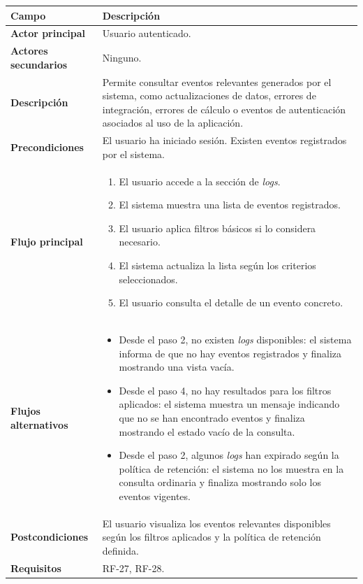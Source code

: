 {\renewcommand{\arraystretch}{1.25}\footnotesize
\begin{longtable}{p{3.2cm}p{10.2cm}}
\toprule
\textbf{Campo} & \textbf{Descripción} \\
\midrule
\textbf{Actor principal} & Usuario autenticado. \\
\textbf{Actores secundarios} & Ninguno. \\
\textbf{Descripción} & Permite consultar eventos relevantes generados por el sistema, como actualizaciones de datos, errores de integración, errores de cálculo o eventos de autenticación asociados al uso de la aplicación. \\
\textbf{Precondiciones} & El usuario ha iniciado sesión. Existen eventos registrados por el sistema. \\
\textbf{Flujo principal} & \begin{minipage}[t]{10.2cm}\begin{enumerate}[noitemsep,leftmargin=*]
    \item El usuario accede a la sección de \textit{logs}.
    \item El sistema muestra una lista de eventos registrados.
    \item El usuario aplica filtros básicos si lo considera necesario.
    \item El sistema actualiza la lista según los criterios seleccionados.
    \item El usuario consulta el detalle de un evento concreto.
\end{enumerate}\end{minipage} \\
\textbf{Flujos alternativos} & \begin{minipage}[t]{10.2cm}\begin{itemize}[noitemsep,leftmargin=*]
    \item Desde el paso 2, no existen \textit{logs} disponibles: el sistema informa de que no hay eventos registrados y finaliza mostrando una vista vacía.
    \item Desde el paso 4, no hay resultados para los filtros aplicados: el sistema muestra un mensaje indicando que no se han encontrado eventos y finaliza mostrando el estado vacío de la consulta.
    \item Desde el paso 2, algunos \textit{logs} han expirado según la política de retención: el sistema no los muestra en la consulta ordinaria y finaliza mostrando solo los eventos vigentes.
\end{itemize}\end{minipage} \\
\textbf{Postcondiciones} & El usuario visualiza los eventos relevantes disponibles según los filtros aplicados y la política de retención definida. \\
\textbf{Requisitos} & RF-27, RF-28. \\
\bottomrule
\end{longtable}
\vspace{0.45em}
}

\FloatBarrier

